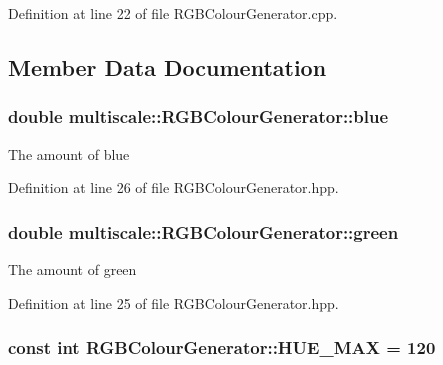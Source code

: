 Definition at line 22 of file R\-G\-B\-Colour\-Generator.\-cpp.



\subsection{Member Data Documentation}
\hypertarget{classmultiscale_1_1RGBColourGenerator_a5b48dae9174a794eb70c779c05d87c3f}{
\subsubsection[{blue}]{\setlength{\rightskip}{0pt plus 5cm}double multiscale\-::\-R\-G\-B\-Colour\-Generator\-::blue\hspace{0.3cm}{\ttfamily [private]}}}\label{classmultiscale_1_1RGBColourGenerator_a5b48dae9174a794eb70c779c05d87c3f}
The amount of blue 

Definition at line 26 of file R\-G\-B\-Colour\-Generator.\-hpp.

\hypertarget{classmultiscale_1_1RGBColourGenerator_ae8d94d24b109954be1da2a04c8ec9af7}{
\subsubsection[{green}]{\setlength{\rightskip}{0pt plus 5cm}double multiscale\-::\-R\-G\-B\-Colour\-Generator\-::green\hspace{0.3cm}{\ttfamily [private]}}}\label{classmultiscale_1_1RGBColourGenerator_ae8d94d24b109954be1da2a04c8ec9af7}
The amount of green 

Definition at line 25 of file R\-G\-B\-Colour\-Generator.\-hpp.

\hypertarget{classmultiscale_1_1RGBColourGenerator_a282d986019f3c02b46c122badf806cd0}{
\subsubsection[{H\-U\-E\-\_\-\-M\-A\-X}]{\setlength{\rightskip}{0pt plus 5cm}const int R\-G\-B\-Colour\-Generator\-::\-H\-U\-E\-\_\-\-M\-A\-X = 120\hspace{0.3cm}{\ttfamily [static]}}}\label{classmultiscale_1_1RGBColourGenerator_a282d986019f3c02b46c122badf806cd0}


